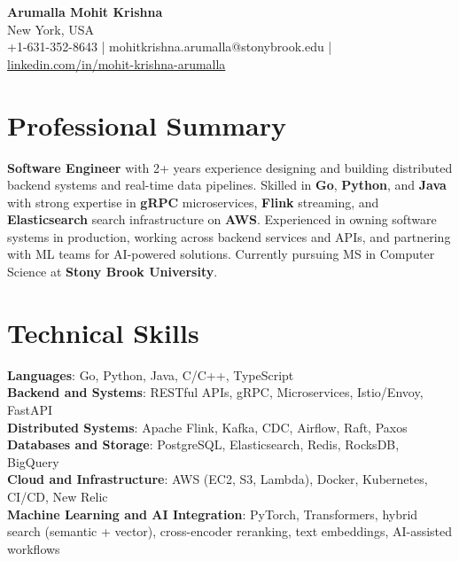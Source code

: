 \documentclass[letterpaper,11pt]{article}
\begin{document}
\begin{center}
  {\Large \textbf{Arumalla Mohit Krishna}} \\
  New York, USA \\
  +1-631-352-8643 \enspace | \enspace mohitkrishna.arumalla@stonybrook.edu \enspace | \enspace \href{https://www.linkedin.com/in/mohit-krishna-arumalla}{linkedin.com/in/mohit-krishna-arumalla}
\end{center}

\section{Professional Summary}
  \begin{itemize}[leftmargin=0.15in, label={}]
    \small{\item{
     \textbf{Software Engineer} with 2+ years experience designing and building distributed backend systems and real-time data pipelines. Skilled in \textbf{Go}, \textbf{Python}, and \textbf{Java} with strong expertise in \textbf{gRPC} microservices, \textbf{Flink} streaming, and \textbf{Elasticsearch} search infrastructure on \textbf{AWS}. Experienced in owning software systems in production, working across backend services and APIs, and partnering with ML teams for AI-powered solutions. Currently pursuing MS in Computer Science at \textbf{Stony Brook University}.
    }}
  \end{itemize}
\vspace{-16pt}

\section{Technical Skills}
 \begin{itemize}[leftmargin=0.15in, label={}]
    \small{\item{
     \textbf{Languages}: Go, Python, Java, C/C++, TypeScript \\
     \textbf{Backend and Systems}: RESTful APIs, gRPC, Microservices, Istio/Envoy, FastAPI \\
     \textbf{Distributed Systems}: Apache Flink, Kafka, CDC, Airflow, Raft, Paxos \\
     \textbf{Databases and Storage}: PostgreSQL, Elasticsearch, Redis, RocksDB, BigQuery \\
     \textbf{Cloud and Infrastructure}: AWS (EC2, S3, Lambda), Docker, Kubernetes, CI/CD, New Relic \\
     \textbf{Machine Learning and AI Integration}: PyTorch, Transformers, hybrid search (semantic + vector), cross-encoder reranking, text embeddings, AI-assisted workflows
    }}
 \end{itemize}
\vspace{-16pt}
\end{document}

